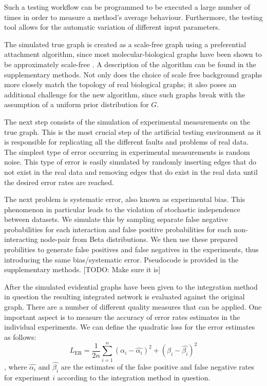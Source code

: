 \documentclass{bioinfo}
\newcommand{\note}[1]{{\color{red}[#1]}}
\begin{document}
\begin{methods}
Such a testing workflow can be programmed to be executed a large number of times in order to measure a method's average behaviour. Furthermore, the testing tool allows for the automatic variation of different input parameters.

The simulated true graph is created as a scale-free graph using a preferential attachment algorithm, since most molecular-biological graphs have been shown to be approximately scale-free \citep{jeong_lethality_2001, eisenberg_preferential_2003}. A description of the algorithm can be found in the supplementary methods.
Not only does the choice of scale free background graphs more closely match the topology of real biological graphs; it also poses an additional challenge for the new algorithm, since such graphs break with the assumption of a uniform prior distribution for $G$.

The next step consists of the simulation of experimental measurements on the true graph. This is the most crucial step of the artificial testing environment as it is responsible for replicating all the different faults and problems of real data. The simplest type of error occurring in experimental measurements is random noise. This type of error is easily simulated by randomly inserting edges that do not exist in the real data and removing edges that do exist in the real data until the desired error rates are reached. 

The next problem is systematic error, also known as experimental bias. This phenomenon in particular leads to the violation of stochastic independence between datasets. We simulate this by sampling separate false negative probabilities for each interaction and false positive probabilities for each non-interacting node-pair from Beta distributions. We then use these prepared probilities to generate false positives and false negatives in the experiments, thus introducing the same bias/systematic error. Pseudocode is provided in the supplementary methods. \note{TODO: Make sure it is}


After the simulated evidential graphs have been given to the integration method in question the resulting integrated network is evaluated against the original graph. There are a number of different quality measures that can be applied. One important aspect is to measure the accuracy of error rates estimates in the individual experiments. We can define the quadratic loss for the error estimates as follows:
\begin{equation}
  L_\text{ER} = \frac{1}{2n}\sum_{i=1}^n (\alpha_i - \hat{\alpha_i})^2 + (\beta_i - \hat{\beta_i})^2
\end{equation},
where $\hat{\alpha_i}$ and $\hat{\beta_i}$ are the estimates of the false positive and false negative rates for experiment $i$ according to the integration method in question.


\end{methods}
\end{document}
